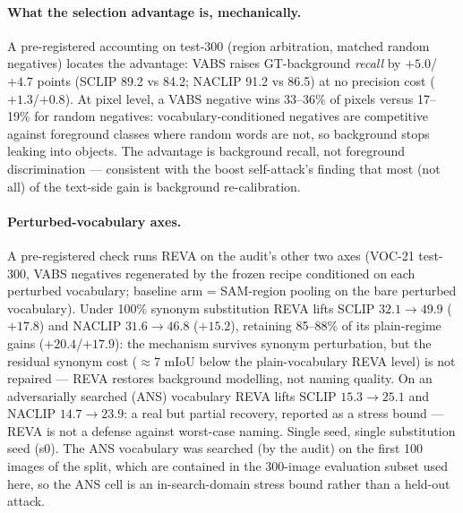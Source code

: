 \documentclass[11pt]{article}
\newcommand{\miou}{mIoU}
\newcommand{\reva}{REVA}
\begin{document}
\paragraph{What the selection advantage is, mechanically.} A pre-registered
accounting on test-300 (region arbitration, matched random negatives) locates
the advantage: VABS raises GT-background \emph{recall} by $+5.0$/$+4.7$ points
(SCLIP 89.2 vs 84.2; NACLIP 91.2 vs 86.5) at no precision cost ($+1.3$/$+0.8$).
At pixel level, a VABS negative wins 33--36\% of pixels versus 17--19\% for
random negatives: vocabulary-conditioned negatives are competitive against
foreground classes where random words are not, so background stops leaking
into objects. The advantage is background recall, not foreground
discrimination --- consistent with the boost self-attack's finding that most
(not all) of the text-side gain is background re-calibration.

\paragraph{Perturbed-vocabulary axes.} A pre-registered check runs \reva{} on
the audit's other two axes (VOC-21 test-300, VABS negatives regenerated by the
frozen recipe conditioned on each perturbed vocabulary; baseline arm = SAM-region
pooling on the bare perturbed vocabulary). Under 100\% synonym substitution
\reva{} lifts SCLIP $32.1\to49.9$ ($+17.8$) and NACLIP $31.6\to46.8$ ($+15.2$),
retaining 85--88\% of its plain-regime gains ($+20.4$/$+17.9$): the mechanism
survives synonym perturbation, but the residual synonym cost ($\approx$7 \miou{}
below the plain-vocabulary \reva{} level) is not repaired --- \reva{} restores
background modelling, not naming quality. On an adversarially searched (ANS)
vocabulary \reva{} lifts SCLIP $15.3\to25.1$ and NACLIP $14.7\to23.9$: a real
but partial recovery, reported as a stress bound --- \reva{} is not a defense
against worst-case naming. Single seed, single substitution seed (s0). The ANS
vocabulary was searched (by the audit) on the first 100 images of the split,
which are contained in the 300-image evaluation subset used here, so the ANS
cell is an in-search-domain stress bound rather than a held-out attack.
\end{document}
